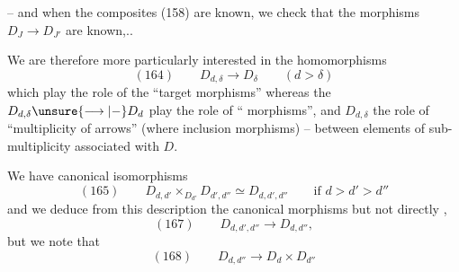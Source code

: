 -- and when the composites (158) are known, we check that the morphisms $D_J\longrightarrow D_{J'}$ are known,..

We are therefore more particularly interested in the homomorphisms
\[
(164)\qquad D_{d,\delta}\longrightarrow D_\delta\qquad(d>\delta)
\]
which play the role of the ``target morphisms'' whereas the $D_{d,\delta}\unsure{\longrightarrow|-}D_d$ play the role of `` morphisms'', and $D_{d,\delta}$ the role of ``multiplicity of arrows'' (where inclusion morphisms) -- between elements of sub-multiplicity  associated with $D$.

We have canonical isomorphisms
\[
(165)\qquad D_{d,d'}\times_{D_{d'}}D_{d',d''}\simeq D_{d,d',d''}\qquad\text{if }d>d'>d''
\]
and we deduce  from this description the canonical morphisms
but not directly ,
\[
(167)\qquad D_{d,d',d''}\longrightarrow D_{d,d''},
\]
but we note that
\[
(168)\qquad D_{d,d''}\longrightarrow D_d\times D_{d''}
\]
